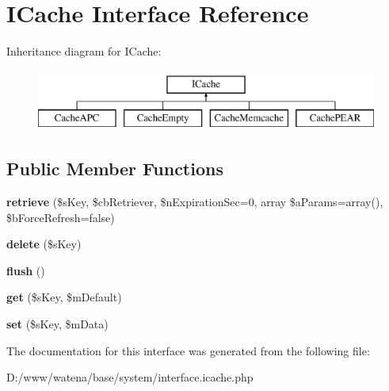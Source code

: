 \hypertarget{interface_i_cache}{\section{I\-Cache Interface Reference}
\label{interface_i_cache}
}
Inheritance diagram for I\-Cache\-:\begin{figure}[H]
\begin{center}
\leavevmode
\includegraphics[height=2.000000cm]{interface_i_cache}
\end{center}
\end{figure}
\subsection*{Public Member Functions}
\begin{DoxyCompactItemize}
\item 
\hypertarget{interface_i_cache_a39aac2ba509c0f4cad43ff6d1a14c3ac}{{\bfseries retrieve} (\$s\-Key, \$cb\-Retriever, \$n\-Expiration\-Sec=0, array \$a\-Params=array(), \$b\-Force\-Refresh=false)}\label{interface_i_cache_a39aac2ba509c0f4cad43ff6d1a14c3ac}

\item 
\hypertarget{interface_i_cache_a778609717fc19918f6a017b51eb5a540}{{\bfseries delete} (\$s\-Key)}\label{interface_i_cache_a778609717fc19918f6a017b51eb5a540}

\item 
\hypertarget{interface_i_cache_a1666520b15f91d5520b3a9311e76f695}{{\bfseries flush} ()}\label{interface_i_cache_a1666520b15f91d5520b3a9311e76f695}

\item 
\hypertarget{interface_i_cache_a049ce08fe13320c4ae433f522cec31a5}{{\bfseries get} (\$s\-Key, \$m\-Default)}\label{interface_i_cache_a049ce08fe13320c4ae433f522cec31a5}

\item 
\hypertarget{interface_i_cache_aaa3a70e0b4687fba5e3512e5987c710a}{{\bfseries set} (\$s\-Key, \$m\-Data)}\label{interface_i_cache_aaa3a70e0b4687fba5e3512e5987c710a}

\end{DoxyCompactItemize}


The documentation for this interface was generated from the following file\-:\begin{DoxyCompactItemize}
\item 
D\-:/www/watena/base/system/interface.\-icache.\-php\end{DoxyCompactItemize}
